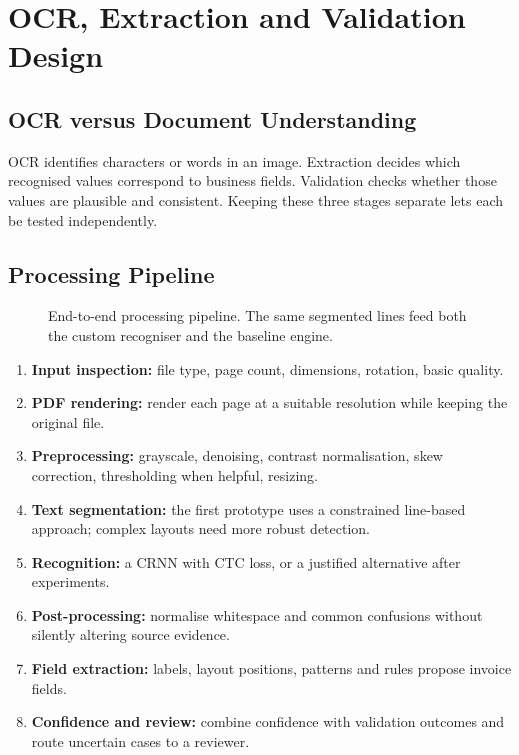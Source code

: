 \chapter{OCR, Extraction and Validation Design}
\section{OCR versus Document Understanding}
OCR identifies characters or words in an image. Extraction decides which recognised values correspond to business fields. Validation checks whether those values are plausible and consistent. Keeping these three stages separate lets each be tested independently.

\section{Processing Pipeline}
\begin{figure}[H]\centering
\resizebox{\textwidth}{!}{}
\caption{End-to-end processing pipeline. The same segmented lines feed both the custom recogniser and the baseline engine.}\label{fig:pipeline}
\end{figure}
\begin{enumerate}
\item \textbf{Input inspection:} file type, page count, dimensions, rotation, basic quality.
\item \textbf{PDF rendering:} render each page at a suitable resolution while keeping the original file.
\item \textbf{Preprocessing:} grayscale, denoising, contrast normalisation, skew correction, thresholding when helpful, resizing.
\item \textbf{Text segmentation:} the first prototype uses a constrained line-based approach; complex layouts need more robust detection.
\item \textbf{Recognition:} a CRNN with CTC loss, or a justified alternative after experiments.
\item \textbf{Post-processing:} normalise whitespace and common confusions without silently altering source evidence.
\item \textbf{Field extraction:} labels, layout positions, patterns and rules propose invoice fields.
\item \textbf{Confidence and review:} combine confidence with validation outcomes and route uncertain cases to a reviewer.
\end{enumerate}

